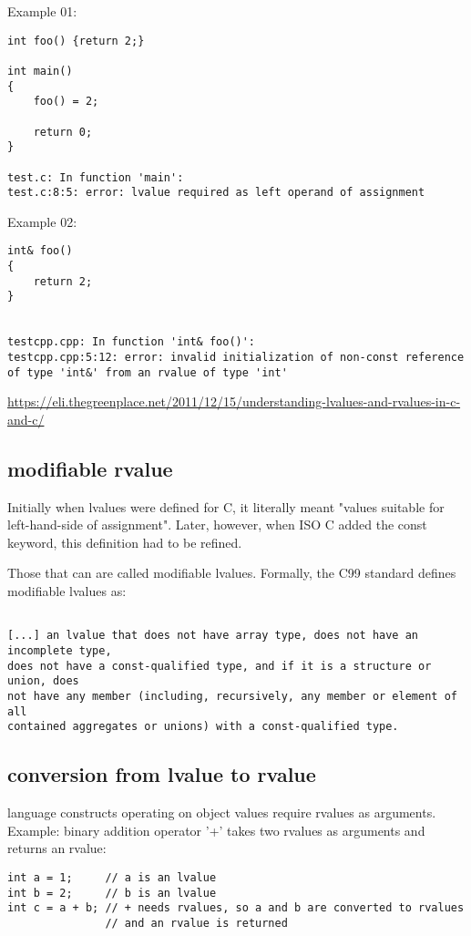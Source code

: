 Example 01:
\begin{verbatim}
int foo() {return 2;}

int main()
{
    foo() = 2;

    return 0;
}

test.c: In function 'main':
test.c:8:5: error: lvalue required as left operand of assignment
\end{verbatim}

Example 02:
\begin{verbatim}
int& foo()
{
    return 2;
}


testcpp.cpp: In function 'int& foo()':
testcpp.cpp:5:12: error: invalid initialization of non-const reference
of type 'int&' from an rvalue of type 'int'
\end{verbatim}
\url{https://eli.thegreenplace.net/2011/12/15/understanding-lvalues-and-rvalues-in-c-and-c/}

\subsection{modifiable rvalue}


Initially when lvalues were defined for C, it literally meant "values suitable
for left-hand-side of assignment". Later, however, when ISO C added the const
keyword, this definition had to be refined.

Those that can are called modifiable lvalues. Formally, the C99 standard defines
modifiable lvalues as:
\begin{verbatim}

[...] an lvalue that does not have array type, does not have an incomplete type,
does not have a const-qualified type, and if it is a structure or union, does
not have any member (including, recursively, any member or element of all
contained aggregates or unions) with a const-qualified type.

\end{verbatim}

\subsection{conversion from lvalue to rvalue}

language constructs operating on object values require rvalues as arguments.
Example: binary addition operator '+' takes two rvalues as arguments and returns an rvalue:

\begin{lstlisting}
int a = 1;     // a is an lvalue
int b = 2;     // b is an lvalue
int c = a + b; // + needs rvalues, so a and b are converted to rvalues
               // and an rvalue is returned
\end{lstlisting}

